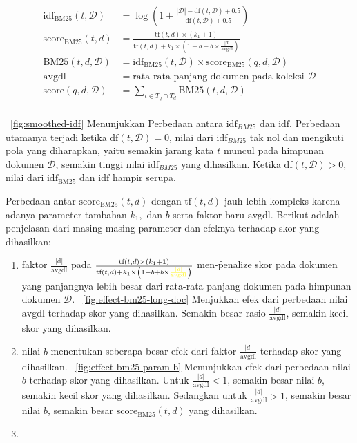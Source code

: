     \begin{align}
        \label{eq:smoothed-idf}
        \text{idf}_{\text{BM25}}(t, \mathcal{D}) &= \log\left(1+\frac{|\mathcal{D}| - \text{df}(t, \mathcal{D}) + 0.5}{\text{df}(t, \mathcal{D}) + 0.5}\right) \\
        \label{eq:bm25scoring}
        \text{score}_{\text{BM25}}(t,d) &= \frac{\text{tf}(t, d) \times (k_1 + 1)}{\text{tf}(t, d) + k_1 \times (1 - b + b \times \frac{|d|}{\text{avgdl}})} \\
        \label{eq:bm25-weight}
        \text{BM25}(t, d, \mathcal{D}) &= \text{idf}_{\text{BM25}}(t, \mathcal{D}) \times \text{score}_{\text{BM25}}(q,d,\mathcal{D}) \\
        \text{avgdl} &= \text{rata-rata panjang dokumen pada koleksi } \mathcal{D} \\
        \label{eq:bm25-end}
        \text{score}(q,d,\mathcal{D}) &= \sum_{t \in T_q \cap T_d} \text{BM25}(t, d, \mathcal{D}) \\
    \end{align}

    
    \pic~\ref{fig:smoothed-idf} Menunjukkan Perbedaan antara $\text{idf}_{BM25}$ dan $\text{idf}$. Perbedaan utamanya terjadi ketika $\text{df}(t,\mathcal{D}) = 0$, nilai dari  $\text{idf}_{BM25}$ tak nol dan mengikuti pola yang diharapkan, yaitu semakin jarang kata $t$ muncul pada himpunan dokumen $\mathcal{D}$, semakin tinggi nilai $\text{idf}_{BM25}$ yang dihasilkan. Ketika $\text{df}(t,\mathcal{D})>0$, nilai dari $\text{idf}_{\text{BM25}}$ dan $\text{idf}$ hampir serupa.

    Perbedaan antar $\text{score}_{\text{BM25}}(t,d)$ dengan $\text{tf}(t, d)$ jauh lebih kompleks karena adanya parameter tambahan $k_1,$ dan $b$ serta faktor baru $\text{avgdl}$. Berikut adalah penjelasan dari masing-masing parameter dan efeknya terhadap skor yang dihasilkan:

    \begin{enumerate}
        \item faktor $\frac{|\text{d}|}{\text{avgdl}}$ pada $\frac{\text{tf}(t, d) \times (k_1 + 1)}{\text{tf}(t, d) + k_1 \times \left(1 - b + b \times \textcolor{yellow}{\frac{|d|}{\text{avgdl}}}\right)}$ men-\f{penalize} skor pada dokumen yang panjangnya lebih besar dari rata-rata panjang dokumen pada himpunan dokumen $\mathcal{D}$. \pic~\ref{fig:effect-bm25-long-doc} Menjukkan efek dari perbedaan nilai $\text{avgdl}$ terhadap skor yang dihasilkan. Semakin besar rasio $\frac{|d|}{\text{avgdl}}$, semakin kecil skor yang dihasilkan.
        \item nilai $b$ menentukan seberapa besar efek dari faktor $\frac{|d|}{\text{avgdl}}$ terhadap skor yang dihasilkan. \pic~\ref{fig:effect-bm25-param-b} Menunjukkan efek dari perbedaan nilai $b$ terhadap skor yang dihasilkan. Untuk $\frac{|d|}{\text{avgdl}}<1$, semakin besar nilai $b$, semakin kecil skor yang dihasilkan. Sedangkan untuk $\frac{|d|}{\text{avgdl}}>1$, semakin besar nilai $b$, semakin besar $\text{score}_{\text{BM25}}(t,d)$ yang dihasilkan.
        \item 
    \end{enumerate}
    

